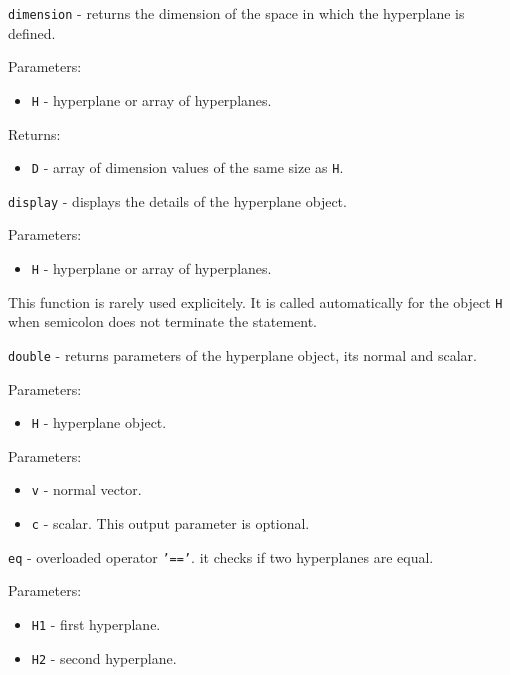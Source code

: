 \documentclass{report}
\begin{document}


\newpage

{\Large {\tt dimension}} - returns the dimension of the space in which
the hyperplane is defined.

Parameters:
\begin{itemize}
\item {\tt H} - hyperplane or array of hyperplanes.
\end{itemize}

Returns:
\begin{itemize}
\item {\tt D} - array of dimension values of the same size as {\tt H}.
\end{itemize}



\newpage

{\Large {\tt display}} - displays the details of the hyperplane object.

Parameters:
\begin{itemize}
\item {\tt H} - hyperplane or array of hyperplanes.
\end{itemize}
This function is rarely used explicitely. It is called automatically
for the object {\tt H} when semicolon does not terminate the statement.

\newpage

{\Large {\tt double}} - returns parameters of the hyperplane object,
its normal and scalar.

Parameters:
\begin{itemize}
\item {\tt H} - hyperplane object.
\end{itemize}

Parameters:
\begin{itemize}
\item {\tt v} - normal vector.
\item {\tt c} - scalar. This output parameter is optional.
\end{itemize}

\newpage

{\Large {\tt eq}} - overloaded operator {\tt '=='}.
it checks if two hyperplanes are equal.

Parameters:
\begin{itemize}
\item {\tt H1} - first hyperplane.
\item {\tt H2} - second hyperplane.
\end{itemize}
\end{document}

